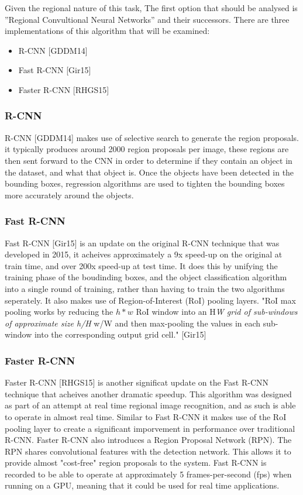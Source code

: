 \documentclass[11pt]{article}
\begin{document}
Given the regional nature of this task, The first option that should be
analysed is ''Regional Convultional Neural Networks'' and their
successors. There are three implementations of this algorithm that will
be examined:

\begin{itemize}
\item
  R-CNN {[}GDDM14{]}
\item
  Fast R-CNN {[}Gir15{]}
\item
  Faster R-CNN {[}RHGS15{]}
\end{itemize}

\subsubsection{R-CNN}\label{r-cnn}

R-CNN {[}GDDM14{]} makes use of selective search to generate the region
proposals. it typically produces around 2000 region proposals per image,
these regions are then sent forward to the CNN in order to determine if
they contain an object in the dataset, and what that object is. Once the
objects have been detected in the bounding boxes, regression algorithms
are used to tighten the bounding boxes more accurately around the
objects.

\subsubsection{Fast R-CNN}\label{fast-r-cnn}

Fast R-CNN {[}Gir15{]} is an update on the original R-CNN technique that
was developed in 2015, it acheives approximately a 9x speed-up on the
original at train time, and over 200x speed-up at test time. It does
this by unifying the training phase of the boudinding boxes, and the
object classification algorithm into a single round of training, rather
than having to train the two algorithms seperately. It also makes use of
Region-of-Interest (RoI) pooling layers. "RoI max pooling works by
reducing the \(h*w\) RoI window into an H\emph{W grid of sub-windows of
approximate size h/H } w/W and then max-pooling the values in each
sub-window into the corresponding output grid cell." {[}Gir15{]}

\subsubsection{Faster R-CNN}\label{faster-r-cnn}

Faster R-CNN {[}RHGS15{]} is another significat update on the Fast R-CNN
technique that acheives another dramatic speedup. This algorithm was
designed as part of an attempt at real time regional image recognition,
and as such is able to operate in almost real time. Similar to Fast
R-CNN it makes use of the RoI pooling layer to create a significant
imporvement in performance over traditional R-CNN. Faster R-CNN also
introduces a Region Proposal Network (RPN). The RPN shares convolutional
features with the detection network. This allows it to provide almost
"cost-free" region proposals to the system. Fast R-CNN is recorded to be
able to operate at approximately 5 frames-per-second (fps) when running
on a GPU, meaning that it could be used for real time applications.
\end{document}
